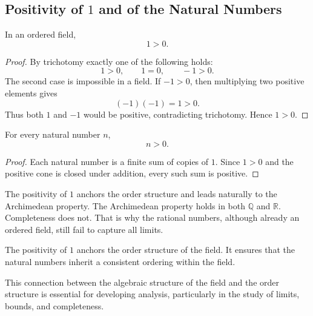 \subsection{Positivity of $1$ and of the Natural Numbers}

\begin{theorem}
\label{thm:one-positive}
In an ordered field,
\[
1>0.
\]
\end{theorem}

\begin{proof}
By trichotomy exactly one of the following holds:
\[
1>0,
\qquad
1=0,
\qquad
-1>0.
\]
The second case is impossible in a field.  If $-1>0$, then multiplying two positive elements gives
\[
(-1)(-1)=1>0.
\]
Thus both $1$ and $-1$ would be positive, contradicting trichotomy.  Hence $1>0$.
\end{proof}

\begin{corollary}
\label{cor:n-positive}
For every natural number $n$,
\[
n>0.
\]
\end{corollary}

\begin{proof}
Each natural number is a finite sum of copies of $1$.  Since $1>0$ and the positive cone is closed
under addition, every such sum is positive.
\end{proof}

\begin{remark}
\label{rem:arch-v-complete}
The positivity of $1$ anchors the order structure and leads naturally to the Archimedean property.
The Archimedean property holds in both $\mathbb{Q}$ and $\mathbb{R}$.  Completeness does not.  That is
why the rational numbers, although already an ordered field, still fail to capture all limits.
\end{remark}


\begin{remark}

The positivity of $1$ anchors the order structure of the field.  It
ensures that the natural numbers inherit a consistent ordering within
the field.

This connection between the algebraic structure of the field and the
order structure is essential for developing analysis, particularly in
the study of limits, bounds, and completeness.

\end{remark}


